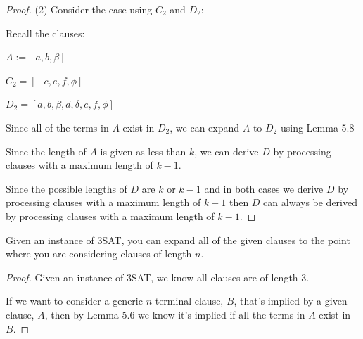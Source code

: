 \documentclass[manuscript]{acmart}
\begin{document}
\begin{proof}
        (2) Consider the case using $C_2$ and $D_2$:
        
        Recall the clauses:

        $A := [a, b, \beta]$

        $C_2 = [-c, e, f, \phi]$

        $D_2 = [a, b, \beta, d, \delta, e, f, \phi]$

        Since all of the terms in $A$ exist in $D_2$, we can expand $A$ to $D_2$ using Lemma 5.8

        Since the length of $A$ is given as less than $k$, we can derive $D$ by processing clauses with a maximum length of $k - 1$.
        
        Since the possible lengths of $D$ are $k$ or $k - 1$ and in both cases we derive $D$ by processing clauses with a maximum length of $k - 1$ then $D$ can always be derived by processing clauses with a maximum length of $k - 1$.
    \end{proof}

    \begin{lemma}
        Given an instance of 3SAT, you can expand all of the given clauses to the point where you are considering clauses of length $n$.
    \end{lemma}
    \begin{proof}
        Given an instance of 3SAT, we know all clauses are of length 3.

        If we want to consider a generic $n$-terminal clause, $B$, that's implied by a given clause, $A$, then by Lemma 5.6 we know it's implied if all the terms in $A$ exist in $B$.
    \end{proof}
\end{document}
